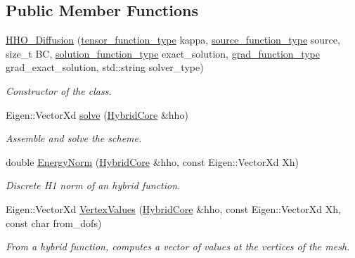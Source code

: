 \subsection*{Public Member Functions}
\begin{DoxyCompactItemize}
\item 
\hyperlink{group__HHO__Diffusion_ga9ab2e2cdf0c77f60069f7572c587c4f1}{H\+H\+O\+\_\+\+Diffusion} (\hyperlink{classHArDCore2D_1_1HHO__Diffusion_acc4abb92b452d6407d45a87823fb47f9}{tensor\+\_\+function\+\_\+type} kappa, \hyperlink{classHArDCore2D_1_1HHO__Diffusion_ade095df766ff04bf09385a163136e5c0}{source\+\_\+function\+\_\+type} source, size\+\_\+t BC, \hyperlink{classHArDCore2D_1_1HHO__Diffusion_ac2ddc18a37be70e4767a9040fb6a09f6}{solution\+\_\+function\+\_\+type} exact\+\_\+solution, \hyperlink{classHArDCore2D_1_1HHO__Diffusion_a14797a72cc96ee5ea6fc45e4986d6a84}{grad\+\_\+function\+\_\+type} grad\+\_\+exact\+\_\+solution, std\+::string solver\+\_\+type)
\begin{DoxyCompactList}\small\item\em Constructor of the class. \end{DoxyCompactList}\item 
Eigen\+::\+Vector\+Xd \hyperlink{group__HHO__Diffusion_ga1aebf22f19de92c115aed69ba394de88}{solve} (\hyperlink{classHArDCore2D_1_1HybridCore}{Hybrid\+Core} \&hho)
\begin{DoxyCompactList}\small\item\em Assemble and solve the scheme. \end{DoxyCompactList}\item 
double \hyperlink{group__HHO__Diffusion_ga1f21d17ee818df40d6c0081300c44982}{Energy\+Norm} (\hyperlink{classHArDCore2D_1_1HybridCore}{Hybrid\+Core} \&hho, const Eigen\+::\+Vector\+Xd Xh)
\begin{DoxyCompactList}\small\item\em Discrete H1 norm of an hybrid function. \end{DoxyCompactList}\item 
Eigen\+::\+Vector\+Xd \hyperlink{group__HHO__Diffusion_ga2b77651b50be012339ca136f4fd90e81}{Vertex\+Values} (\hyperlink{classHArDCore2D_1_1HybridCore}{Hybrid\+Core} \&hho, const Eigen\+::\+Vector\+Xd Xh, const char from\+\_\+dofs)
\begin{DoxyCompactList}\small\item\em From a hybrid function, computes a vector of values at the vertices of the mesh. \end{DoxyCompactList}\item 

\end{DoxyCompactItemize}

